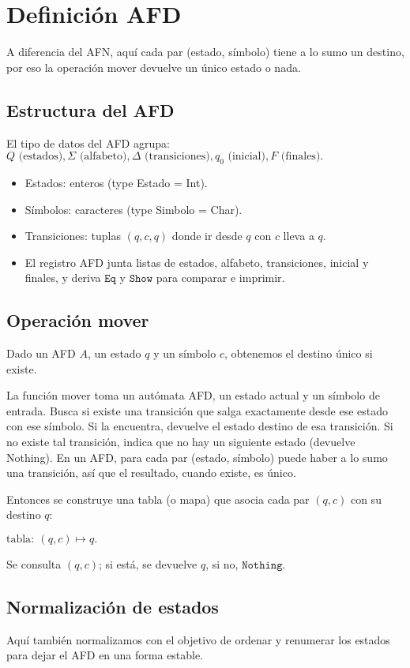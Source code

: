 \section{Definición AFD}

A diferencia del AFN, aquí cada par (estado, símbolo) tiene a lo sumo un destino, por eso la operación mover devuelve un único estado o nada.

\subsection{Estructura del AFD}
El tipo de datos del AFD agrupa:
$
Q \text{ (estados)}, \Sigma \text{ (alfabeto)},\Delta \text{ (transiciones)}, q_0 \text{ (inicial)}, F \text{ (finales)}.
$

\begin{itemize}
    \item Estados: enteros (type Estado = Int).
    \item Símbolos: caracteres (type Simbolo = Char).
    \item Transiciones: tuplas $ (q, c, q) $ donde ir desde $q$ con $c$ lleva a $q$.
    \item El registro AFD junta listas de estados, alfabeto, transiciones, inicial y finales, y deriva $\texttt{Eq}$ y $\texttt{Show}$ para comparar e imprimir.
\end{itemize}


\subsection{Operación mover}
Dado un AFD $A$, un estado $q$ y un símbolo $c$, obtenemos el destino único si existe.

La función mover toma un autómata AFD, un estado actual y un símbolo de entrada. Busca si existe una transición que salga exactamente desde ese estado con ese símbolo. Si la encuentra, devuelve el estado destino de esa transición. Si no existe tal transición, indica que no hay un siguiente estado (devuelve Nothing). En un AFD, para cada par (estado, símbolo) puede haber a lo sumo una transición, así que el resultado, cuando existe, es único.

Entonces se construye una tabla (o mapa) que asocia cada par $ (q, c) $ con su destino $ q $:

$
\text{tabla}:\ (q, c) \mapsto q.
$

Se consulta $ (q, c) $; si está, se devuelve $ q $, si no, $\texttt{Nothing}$.


\subsection{Normalización de estados}
Aquí también normalizamos con el objetivo de ordenar y renumerar los estados para dejar el AFD en una forma estable.

